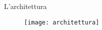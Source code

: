 \begin{frame}[t,noframenumbering]{L'architettura}
\vspace{0.5cm}
\begin{figure}[h]
\centering
\texttt{[image: architettura]}
\end{figure}
\end{frame}